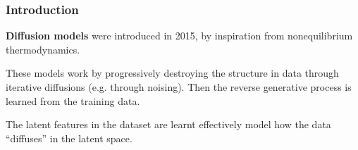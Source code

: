 \begin{frame}
    \frametitle{Introduction}
    \textbf{Diffusion models} were introduced in 2015, by inspiration from nonequilibrium thermodynamics.

    These models work by progressively destroying the structure in data through iterative diffusions (e.g. through noising). Then the reverse generative process is learned from the training data.

    The latent features in the dataset are learnt effectively model how the data ``diffuses'' in the latent space.
\end{frame}